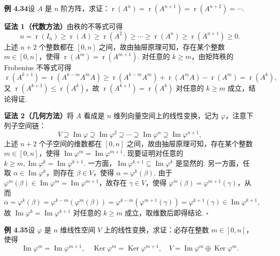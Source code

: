 \documentclass[UTF8,12pt,a4paper,fontset=fandol]{ctexart}
\begin{document}
\noindent\textbf{例 4.34}\quad 设 $A$ 是 $n$ 阶方阵，求证：$\operatorname{r}(A^n)=\operatorname{r}(A^{n+1})=\operatorname{r}(A^{n+2})=\cdots$.

\noindent\textbf{证法 1（代数方法）}\quad 由秩的不等式可得
\[
n=\operatorname{r}(I_n)\ge \operatorname{r}(A)\ge \operatorname{r}(A^2)\ge\cdots\ge \operatorname{r}(A^n)\ge \operatorname{r}(A^{n+1})\ge0.
\]
上述 $n+2$ 个整数都在 $[0,n]$ 之间，故由抽屉原理可知，存在某个整数 $m\in[0,n]$，使得 $\operatorname{r}(A^m)=\operatorname{r}(A^{m+1})$. 对任意的 $k\ge m$，由矩阵秩的 Frobenius 不等式可得
\[
\operatorname{r}(A^{k+1})=\operatorname{r}(A^{k-m}A^mA)\ge \operatorname{r}(A^{k-m}A^m)+\operatorname{r}(A^mA)-\operatorname{r}(A^m)=\operatorname{r}(A^k),
\]
又 $\operatorname{r}(A^{k+1})\le\operatorname{r}(A^k)$，故 $\operatorname{r}(A^{k+1})=\operatorname{r}(A^k)$ 对任意的 $k\ge m$ 成立，结论得证.

\noindent\textbf{证法 2（几何方法）}\quad 将 $A$ 看成是 $n$ 维列向量空间上的线性变换，记为 $\varphi$，注意下列子空间链：
\[
V\supseteq\operatorname{Im}\varphi\supseteq\operatorname{Im}\varphi^2\supseteq\cdots\supseteq\operatorname{Im}\varphi^n\supseteq\operatorname{Im}\varphi^{n+1},
\]
上述 $n+2$ 个子空间的维数都在 $[0,n]$ 之间，故由抽屉原理可知，存在某个整数 $m\in[0,n]$，使得 $\operatorname{Im}\varphi^m=\operatorname{Im}\varphi^{m+1}$. 现要证明对任意的 $k\ge m,\operatorname{Im}\varphi^k=\operatorname{Im}\varphi^{k+1}$. 一方面，$\operatorname{Im}\varphi^{k+1}\subseteq\operatorname{Im}\varphi^k$ 是显然的. 另一方面，任取 $\alpha\in\operatorname{Im}\varphi^k$，则存在 $\beta\in V$，使得 $\alpha=\varphi^k(\beta)$. 由于 $\varphi^m(\beta)\in\operatorname{Im}\varphi^m=\operatorname{Im}\varphi^{m+1}$，故存在 $\gamma\in V$，使得 $\varphi^m(\beta)=\varphi^{m+1}(\gamma)$，从而
\[
\alpha=\varphi^k(\beta)=\varphi^{k-m}(\varphi^m(\beta))=\varphi^{k-m}(\varphi^{m+1}(\gamma))=\varphi^{k+1}(\gamma)\in\operatorname{Im}\varphi^{k+1},
\]
故 $\operatorname{Im}\varphi^k=\operatorname{Im}\varphi^{k+1}$ 对任意的 $k\ge m$ 成立，取维数后即得结论. $\square$

\noindent\textbf{例 4.35}\quad 设 $\varphi$ 是 $n$ 维线性空间 $V$ 上的线性变换，求证：必存在整数 $m\in[0,n]$，使得
\[
\operatorname{Im}\varphi^m=\operatorname{Im}\varphi^{m+1},\quad
\operatorname{Ker}\varphi^m=\operatorname{Ker}\varphi^{m+1},\quad
V=\operatorname{Im}\varphi^m\oplus\operatorname{Ker}\varphi^m.
\]
\end{document}
